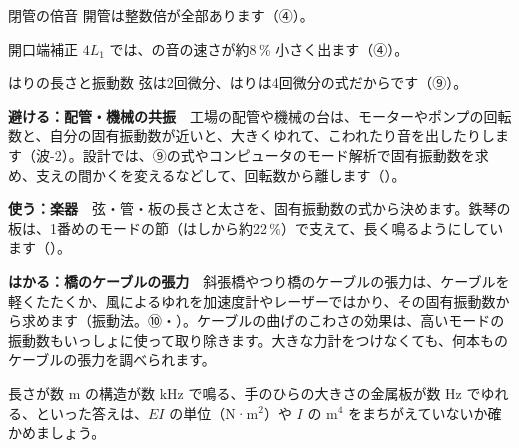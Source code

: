 \begin{tsumazuki}{閉管の倍音}
開管は整数倍が全部あります（④）。
\end{tsumazuki}

\begin{tsumazuki}{開口端補正}
$4L_1$ では、の音の速さが約8\,\% 小さく出ます（④）。
\end{tsumazuki}

\begin{tsumazuki}{はりの長さと振動数}
弦は2回微分、はりは4回微分の式だからです（⑨）。
\end{tsumazuki}

\begin{phkougaku}
\textbf{避ける：配管・機械の共振}　工場の配管や機械の台は、モーターやポンプの回転数と、自分の固有振動数が近いと、大きくゆれて、こわれたり音を出したりします（波-2）。設計では、⑨の式やコンピュータのモード解析で固有振動数を求め、支えの間かくを変えるなどして、回転数から離します（）。

\textbf{使う：楽器}　弦・管・板の長さと太さを、固有振動数の式から決めます。鉄琴の板は、1番めのモードの節（はしから約22\,\%）で支えて、長く鳴るようにしています（）。

\textbf{はかる：橋のケーブルの張力}　斜張橋やつり橋のケーブルの張力は、ケーブルを軽くたたくか、風によるゆれを加速度計やレーザーではかり、その固有振動数から求めます（振動法。⑩・）。ケーブルの曲げのこわさの効果は、高いモードの振動数もいっしょに使って取り除きます。大きな力計をつけなくても、何本ものケーブルの張力を調べられます。

\begin{phketa}[固有振動数の目安]
長さが数 m の構造が数 kHz で鳴る、手のひらの大きさの金属板が数 Hz でゆれる、といった答えは、$EI$ の単位（N·m$^2$）や $I$ の m$^4$ をまちがえていないか確かめましょう。
\end{phketa}
\end{phkougaku}

